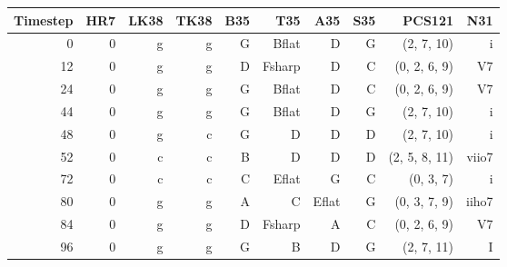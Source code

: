 \begin{tabular}{r|rrrrrrrrr}
    Timestep & HR7 & LK38 & TK38 & B35          & T35          & A35         & S35          & PCS121        & N31   \\ \hline
0        & 0   & g    & g    & G            & B\gls{flat}  & D           & G            & (2, 7, 10)    & i     \\
12       & 0   & g    & g    & D            & F\gls{sharp} & D           & C            & (0, 2, 6, 9)  & V7    \\
24       & 0   & g    & g    & G            & B\gls{flat}  & D           & C            & (0, 2, 6, 9)  & V7    \\
44       & 0   & g    & g    & G            & B\gls{flat}  & D           & G            & (2, 7, 10)    & i     \\ \hline
48       & 0   & g    & c    & G            & D            & D           & D            & (2, 7, 10)    & i     \\
52       & 0   & c    & c    & B            & D            & D           & D            & (2, 5, 8, 11) & viio7 \\
72       & 0   & c    & c    & C            & E\gls{flat}  & G           & C            & (0, 3, 7)     & i     \\
80       & 0   & g    & g    & A            & C            & E\gls{flat} & G            & (0, 3, 7, 9)  & iiho7 \\
84       & 0   & g    & g    & D            & F\gls{sharp} & A           & C            & (0, 2, 6, 9)  & V7    \\
96       & 0   & g    & g    & G            & B            & D           & G            & (2, 7, 11)    & I     \\
\end{tabular}
